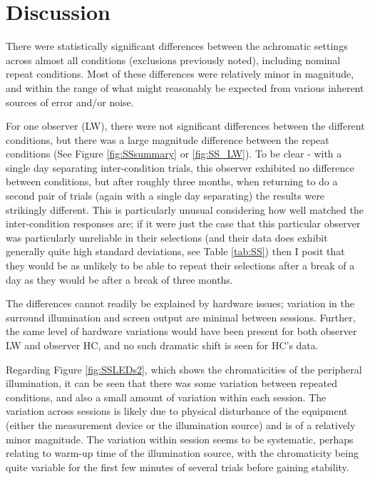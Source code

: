 
\section{Discussion}

There were statistically significant differences between the achromatic settings across almost all conditions (exclusions previously noted), including nominal repeat conditions. Most of these differences were relatively minor in magnitude, and within the range of what might reasonably be expected from various inherent sources of error and/or noise.

For one observer (LW), there were not significant differences between the different conditions, but there was a large magnitude difference between the repeat conditions (See Figure \ref{fig:SSsummary} or \ref{fig:SS_LW}). To be clear - with a single day separating inter-condition trials, this observer exhibited no difference between conditions, but after roughly three months, when returning to do a second pair of trials (again with a single day separating) the results were strikingly different. This is particularly unusual considering how well matched the inter-condition responses are; if it were just the case that this particular observer was particularly unreliable in their selections (and their data does exhibit generally quite high standard deviations, see Table \ref{tab:SS}) then I posit that they would be as unlikely to be able to repeat their selections after a break of a day as they would be after a break of three months.

The differences cannot readily be explained by hardware issues; variation in the surround illumination and screen output are minimal between sessions. Further, the same level of hardware variations would have been present for both observer LW and observer HC, and no such dramatic shift is seen for HC's data.

Regarding Figure \ref{fig:SSLEDs2}, which shows the chromaticities of the peripheral illumination, it can be seen that there was some variation between repeated conditions, and also a small amount of variation within each session. The variation across sessions is likely due to physical disturbance of the equipment (either the measurement device or the illumination source) and is of a relatively minor magnitude. The variation within session seems to be systematic, perhaps relating to warm-up time of the illumination source, with the chromaticity being quite variable for the first few minutes of several trials before gaining stability.


